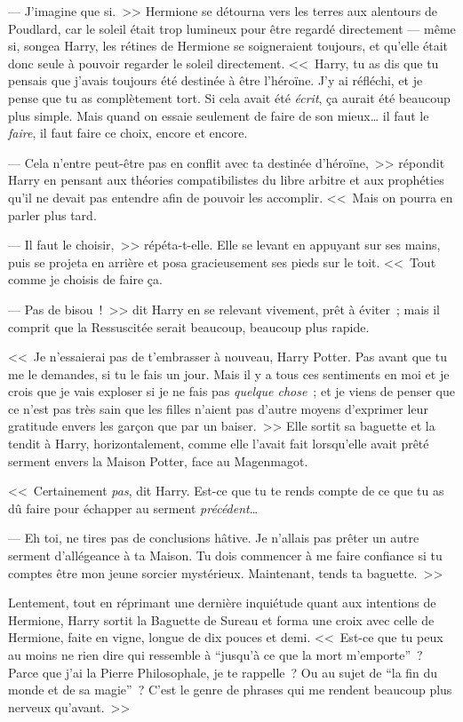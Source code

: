 --- J'imagine que si.~>> Hermione se détourna vers les terres aux alentours de Poudlard, car le soleil était trop lumineux pour être regardé directement — même si, songea Harry, les rétines de Hermione se soigneraient toujours, et qu'elle était donc seule à pouvoir regarder le soleil directement. <<~Harry, tu as dis que tu pensais que j'avais toujours été destinée à être l'héroïne. J'y ai réfléchi, et je pense que tu as complètement tort. Si cela avait été \emph{écrit}, ça aurait été beaucoup plus simple. Mais quand on essaie seulement de faire de son mieux… il faut le \emph{faire}, il faut faire ce choix, encore et encore.

--- Cela n'entre peut-être pas en conflit avec ta destinée d'héroïne,~>> répondit Harry en pensant aux théories compatibilistes du libre arbitre et aux prophéties qu'il ne devait pas entendre afin de pouvoir les accomplir. <<~Mais on pourra en parler plus tard.

--- Il faut le choisir,~>> répéta-t-elle. Elle se levant en appuyant sur ses mains, puis se projeta en arrière et posa gracieusement ses pieds sur le toit. <<~Tout comme je choisis de faire ça.

--- Pas de bisou~!~>> dit Harry en se relevant vivement, prêt à éviter~; mais il comprit que la Ressuscitée serait beaucoup, beaucoup plus rapide.

<<~Je n'essaierai pas de t'embrasser à nouveau, Harry Potter. Pas avant que tu me le demandes, si tu le fais un jour. Mais il y a tous ces sentiments en moi et je crois que je vais exploser si je ne fais pas \emph{quelque chose}~; et je viens de penser que ce n'est pas très sain que les filles n'aient pas d'autre moyens d'exprimer leur gratitude envers les garçon que par un baiser.~>> Elle sortit sa baguette et la tendit à Harry, horizontalement, comme elle l'avait fait lorsqu'elle avait prêté serment envers la Maison Potter, face au Magenmagot.

<<~Certainement \emph{pas}, dit Harry. Est-ce que tu te rends compte de ce que tu as dû faire pour échapper au serment \emph{précédent}…

--- Eh toi, ne tires pas de conclusions hâtive. Je n'allais pas prêter un autre serment d'allégeance à ta Maison. Tu dois commencer à me faire confiance si tu comptes être mon jeune sorcier mystérieux. Maintenant, tends ta baguette.~>>

Lentement, tout en réprimant une dernière inquiétude quant aux intentions de Hermione, Harry sortit la Baguette de Sureau et forma une croix avec celle de Hermione, faite en vigne, longue de dix pouces et demi. <<~Est-ce que tu peux au moins ne rien dire qui ressemble à “jusqu'à ce que la mort m'emporte”~? Parce que j'ai la Pierre Philosophale, je te rappelle~? Ou au sujet de “la fin du monde et de sa magie”~? C'est le genre de phrases qui me rendent beaucoup plus nerveux qu'avant.~>>

